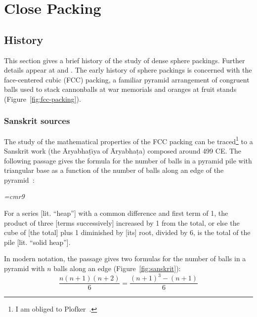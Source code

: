 

\chapter{Close Packing}

\section{History}\label{sec:history}

This section gives a brief history of the study of dense sphere
packings.  Further details appear at \cite{Szpiro} and
\cite{Hales:2006:overview}.
The early history of sphere packings is concerned with the
face-centered cubic (FCC) packing, a familiar pyramid arrangement
of congruent balls used to stack cannonballs at war memorials and
oranges at fruit stands (Figure~\ref{fig:fcc-packing}).

\figDHQRILO %


\subsection{Sanskrit sources}



The study of the mathematical properties of the FCC
packing can be traced\footnote{I am obliged to Plofker~\cite{Plo00}.} to a Sanskrit work (the \=Aryabha\d t\={\i}ya
 of \=Aryabha\d ta) composed around 499 CE.  The following passage gives
the formula for the number of balls in a pyramid pile with triangular base as
a function of the number of balls along an edge of the pyramid~\cite{Ary}:


\bigskip

{\narrower\it\font\ninerm=cmr9

For a series [lit. ``heap''] with a common difference and
  first term of 1, the product of three [terms successively] increased
  by 1 from the total, or else the cube of [the total] plus 1
  diminished by [its] root, divided by 6, is the total of the pile
  [lit. ``solid heap''].  

}

\bigskip

 In modern notation, the passage gives two formulas for the number of
 balls in a pyramid with $n$ balls along an edge (Figure~\ref{fig:sanskrit}):
\begin{equation}\label{eqn:sanskrit}
\dfrac{n(n+1)(n+2)}{6} =  \dfrac{(n+1)^3 - (n+1)}{6}
\end{equation}


